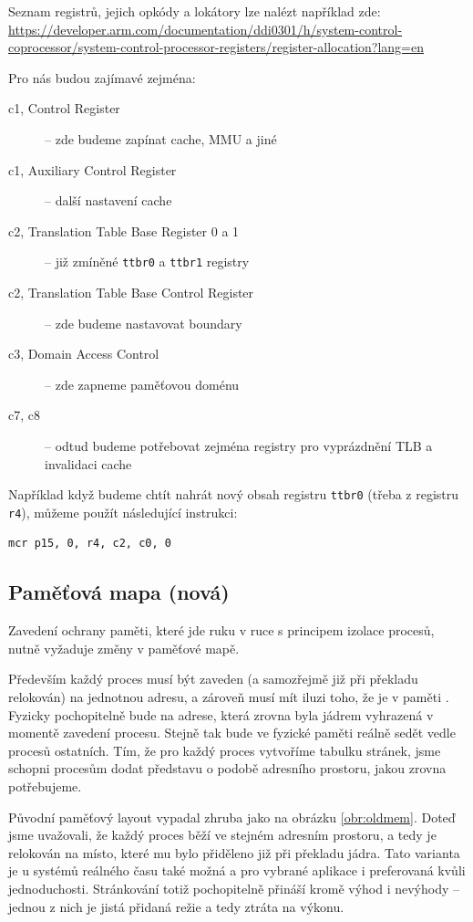 \documentclass{article}
\begin{document}
Seznam registrů, jejich opkódy a lokátory lze nalézt například zde: \url{https://developer.arm.com/documentation/ddi0301/h/system-control-coprocessor/system-control-processor-registers/register-allocation?lang=en}

Pro nás budou zajímavé zejména:
\begin{description}
	\item[c1, Control Register] -- zde budeme zapínat cache, MMU a jiné
	\item[c1, Auxiliary Control Register] -- další nastavení cache
	\item[c2, Translation Table Base Register 0 a 1] -- již zmíněné \texttt{ttbr0} a \texttt{ttbr1} registry
	\item[c2, Translation Table Base Control Register] -- zde budeme nastavovat boundary
	\item[c3, Domain Access Control] -- zde zapneme paměťovou doménu
	\item[c7, c8] -- odtud budeme potřebovat zejména registry pro vyprázdnění TLB a invalidaci cache
\end{description}

Například když budeme chtít nahrát nový obsah registru \texttt{ttbr0} (třeba z registru \texttt{r4}), můžeme použít následující instrukci:
\begin{lstlisting}
mcr p15, 0, r4, c2, c0, 0
\end{lstlisting}

\subsection{Paměťová mapa (nová)}

Zavedení ochrany paměti, které jde ruku v ruce s principem izolace procesů, nutně vyžaduje změny v paměťové mapě. 

Především každý proces musí být zaveden (a samozřejmě již při překladu relokován) na jednotnou adresu, a zároveň musí mít iluzi toho, že je v paměti . Fyzicky pochopitelně bude na adrese, která zrovna byla jádrem vyhrazená v momentě zavedení procesu. Stejně tak bude ve fyzické paměti reálně sedět vedle procesů ostatních. Tím, že pro každý proces vytvoříme tabulku stránek, jsme schopni procesům dodat představu o podobě adresního prostoru, jakou zrovna potřebujeme.

Původní paměťový layout vypadal zhruba jako na obrázku \ref{obr:oldmem}. Doteď jsme uvažovali, že každý proces běží ve stejném adresním prostoru, a tedy je relokován na místo, které mu bylo přiděleno již při překladu jádra. Tato varianta je u systémů reálného času také možná a pro vybrané aplikace i preferovaná kvůli jednoduchosti. Stránkování totiž pochopitelně přináší kromě výhod i nevýhody -- jednou z nich je jistá přidaná režie a tedy ztráta na výkonu.
\end{document}
